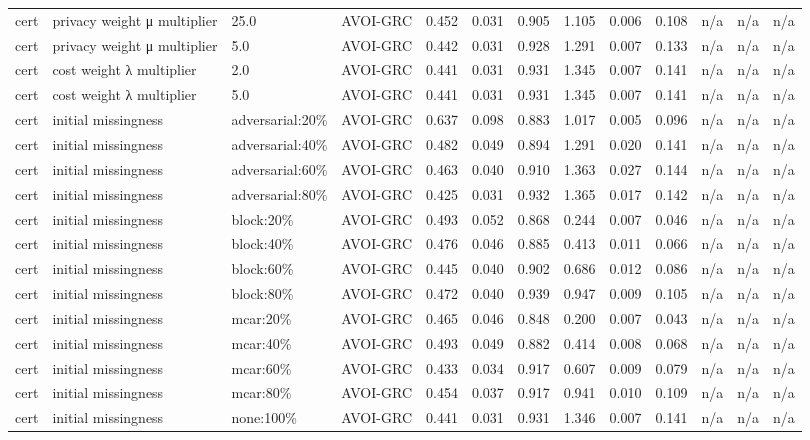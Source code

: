 \begin{table}[!ht]
{\begin{tabular}{lllllllllllll}
cert & privacy weight μ multiplier & 25.0 & AVOI-GRC & 0.452 & 0.031 & 0.905 & 1.105 & 0.006 & 0.108 & n/a & n/a & n/a \\
cert & privacy weight μ multiplier & 5.0 & AVOI-GRC & 0.442 & 0.031 & 0.928 & 1.291 & 0.007 & 0.133 & n/a & n/a & n/a \\
cert & cost weight λ multiplier & 2.0 & AVOI-GRC & 0.441 & 0.031 & 0.931 & 1.345 & 0.007 & 0.141 & n/a & n/a & n/a \\
cert & cost weight λ multiplier & 5.0 & AVOI-GRC & 0.441 & 0.031 & 0.931 & 1.345 & 0.007 & 0.141 & n/a & n/a & n/a \\
cert & initial missingness & adversarial:20\% & AVOI-GRC & 0.637 & 0.098 & 0.883 & 1.017 & 0.005 & 0.096 & n/a & n/a & n/a \\
cert & initial missingness & adversarial:40\% & AVOI-GRC & 0.482 & 0.049 & 0.894 & 1.291 & 0.020 & 0.141 & n/a & n/a & n/a \\
cert & initial missingness & adversarial:60\% & AVOI-GRC & 0.463 & 0.040 & 0.910 & 1.363 & 0.027 & 0.144 & n/a & n/a & n/a \\
cert & initial missingness & adversarial:80\% & AVOI-GRC & 0.425 & 0.031 & 0.932 & 1.365 & 0.017 & 0.142 & n/a & n/a & n/a \\
cert & initial missingness & block:20\% & AVOI-GRC & 0.493 & 0.052 & 0.868 & 0.244 & 0.007 & 0.046 & n/a & n/a & n/a \\
cert & initial missingness & block:40\% & AVOI-GRC & 0.476 & 0.046 & 0.885 & 0.413 & 0.011 & 0.066 & n/a & n/a & n/a \\
cert & initial missingness & block:60\% & AVOI-GRC & 0.445 & 0.040 & 0.902 & 0.686 & 0.012 & 0.086 & n/a & n/a & n/a \\
cert & initial missingness & block:80\% & AVOI-GRC & 0.472 & 0.040 & 0.939 & 0.947 & 0.009 & 0.105 & n/a & n/a & n/a \\
cert & initial missingness & mcar:20\% & AVOI-GRC & 0.465 & 0.046 & 0.848 & 0.200 & 0.007 & 0.043 & n/a & n/a & n/a \\
cert & initial missingness & mcar:40\% & AVOI-GRC & 0.493 & 0.049 & 0.882 & 0.414 & 0.008 & 0.068 & n/a & n/a & n/a \\
cert & initial missingness & mcar:60\% & AVOI-GRC & 0.433 & 0.034 & 0.917 & 0.607 & 0.009 & 0.079 & n/a & n/a & n/a \\
cert & initial missingness & mcar:80\% & AVOI-GRC & 0.454 & 0.037 & 0.917 & 0.941 & 0.010 & 0.109 & n/a & n/a & n/a \\
cert & initial missingness & none:100\% & AVOI-GRC & 0.441 & 0.031 & 0.931 & 1.346 & 0.007 & 0.141 & n/a & n/a & n/a \\

\end{tabular}}
\end{table}
